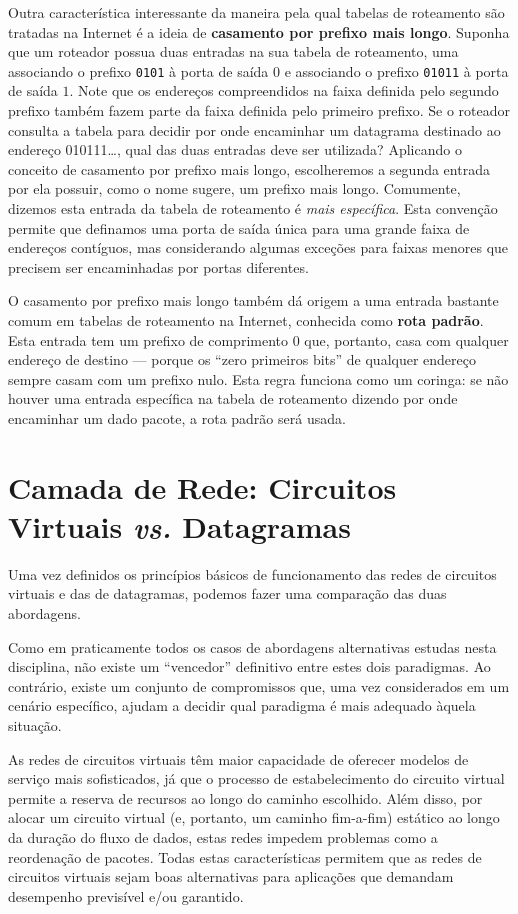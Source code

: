 \documentclass{article}
\begin{document}
Outra característica interessante da maneira pela qual tabelas de roteamento são tratadas na Internet é a ideia de \textbf{casamento por prefixo mais longo}. Suponha que um roteador possua duas entradas na sua tabela de roteamento, uma associando o prefixo \texttt{0101} à porta de saída $0$ e associando o prefixo \texttt{01011} à porta de saída $1$. Note que os endereços compreendidos na faixa definida pelo segundo prefixo também fazem parte da faixa definida pelo primeiro prefixo. Se o roteador consulta a tabela para decidir por onde encaminhar um datagrama destinado ao endereço 010111\dots, qual das duas entradas deve ser utilizada? Aplicando o conceito de casamento por prefixo mais longo, escolheremos a segunda entrada por ela possuir, como o nome sugere, um prefixo mais longo. Comumente, dizemos esta entrada da tabela de roteamento é \textit{mais específica}. Esta convenção permite que definamos uma porta de saída única para uma grande faixa de endereços contíguos, mas considerando algumas exceções para faixas menores que precisem ser encaminhadas por portas diferentes.

O casamento por prefixo mais longo também dá origem a uma entrada bastante comum em tabelas de roteamento na Internet, conhecida como \textbf{rota padrão}. Esta entrada tem um prefixo de comprimento 0 que, portanto, casa com qualquer endereço de destino --- porque os ``zero primeiros bits'' de qualquer endereço sempre casam com um prefixo nulo. Esta regra funciona como um coringa: se não houver uma entrada específica na tabela de roteamento dizendo por onde encaminhar um dado pacote, a rota padrão será usada.

\section{Camada de Rede: Circuitos Virtuais \textit{vs.} Datagramas}

Uma vez definidos os princípios básicos de funcionamento das redes de circuitos virtuais e das de datagramas, podemos fazer uma comparação das duas abordagens.

Como em praticamente todos os casos de abordagens alternativas estudas nesta disciplina, não existe um ``vencedor'' definitivo entre estes dois paradigmas. Ao contrário, existe um conjunto de compromissos que, uma vez considerados em um cenário específico, ajudam a decidir qual paradigma é mais adequado àquela situação.

As redes de circuitos virtuais têm maior capacidade de oferecer modelos de serviço mais sofisticados, já que o processo de estabelecimento do circuito virtual permite a reserva de recursos ao longo do caminho escolhido. Além disso, por alocar um circuito virtual (e, portanto, um caminho fim-a-fim) estático ao longo da duração do fluxo de dados, estas redes impedem problemas como a reordenação de pacotes. Todas estas características permitem que as redes de circuitos virtuais sejam boas alternativas para aplicações que demandam desempenho previsível e/ou garantido.
\end{document}
